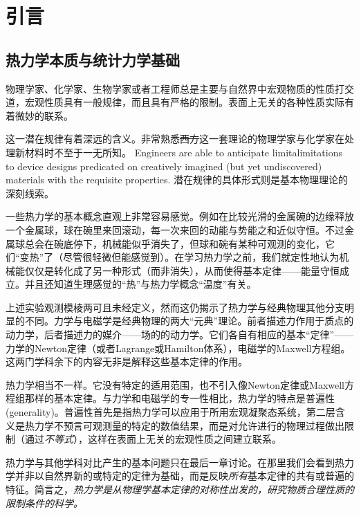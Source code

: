 

\chapter*{引言}
\section*{热力学本质与统计力学基础}

物理学家、化学家、生物学家或者工程师总是主要与自然界中宏观物质的性质打交道，宏观性质具有一般规律，而且具有严格的限制。表面上无关的各种性质实际有着微妙的联系。

这一潜在规律有着深远的含义。非常熟悉\sout{西方}这一套理论的物理学家与化学家在处理新材料时不至于一无所知。{\color{red} Engineers are able to anticipate limitalimitations to device designs predicated on creatively imagined (but yet undiscovered) materials with the requisite properties.} 潜在规律的具体形式则是基本物理理论的深刻线索。

一些热力学的基本概念直观上非常容易感觉。例如在比较光滑的金属碗的边缘释放一个金属球，球在碗里来回滚动，每一次来回的动能与势能之和近似守恒。不过金属球总会在碗底停下，机械能似乎消失了，但球和碗有某种可观测的变化，它们“变热”了（尽管很轻微但能感觉到）。在学习热力学之前，我们就定性地认为机械能仅仅是转化成了另一种形式（而非消失），从而使得基本定律——能量守恒成立。并且还知道生理感觉的“热”与热力学概念“温度”有关。

上述实验观测模棱两可且未经定义，然而这仍揭示了热力学与经典物理其他分支明显的不同。力学与电磁学是经典物理的两大“元典”理论。前者描述力作用于质点的动力学，后者描述力的媒介——场的的动力学。它们各自有相应的基本“定律”——力学的Newton定律（或者Lagrange或Hamilton体系），电磁学的Maxwell方程组。这两门学科余下的内容无非是解释这些基本定律的作用。

热力学相当不一样。它没有特定的适用范围，也不引入像Newton定律或Maxwell方程组那样的基本定律。与力学和电磁学的专一性相比，热力学的特点是普遍性(generality)。普遍性首先是指热力学可以应用于所用宏观凝聚态系统，第二层含义是热力学不预言可观测量的特定的数值结果，而是对允许进行的物理过程做出限制（通过{\it 不等式}），这样在表面上无关的宏观性质之间建立联系。

热力学与其他学科对比产生的基本问题只在最后一章讨论。在那里我们会看到热力学并非以自然界新的或特定的定律为基础，而是反映{\it 所有}基本定律的共有或普遍的特征。简言之，{\it 热力学是从物理学基本定律的对称性出发的，研究物质合理性质的限制条件的科学。}

